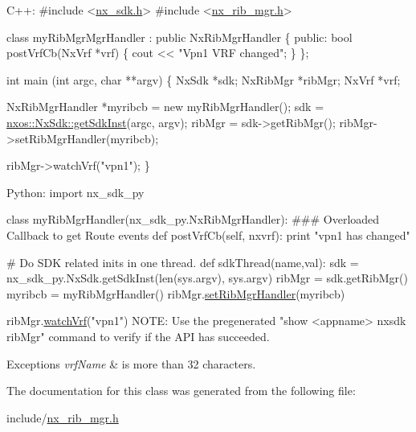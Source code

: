 \begin{DoxyCode}
 C++:
\textcolor{preprocessor}{      #include <\mbox{\hyperlink{nx__sdk_8h}{nx\_sdk.h}}>}
\textcolor{preprocessor}{      #include <\mbox{\hyperlink{nx__rib__mgr_8h}{nx\_rib\_mgr.h}}>}

      \textcolor{keyword}{class }myRibMgrMgrHandler : \textcolor{keyword}{public} NxRibMgrHandler \{
         \textcolor{keyword}{public}:
            \textcolor{keywordtype}{bool} postVrfCb(NxVrf *vrf) \{
                 cout << \textcolor{stringliteral}{"Vpn1 VRF changed"};
            \}
      \};

      \textcolor{keywordtype}{int}  main (\textcolor{keywordtype}{int} argc, \textcolor{keywordtype}{char} **argv)
      \{
           NxSdk    *sdk;
           NxRibMgr *ribMgr;
           NxVrf    *vrf;

           NxRibMgrHandler *myribcb = \textcolor{keyword}{new} myRibMgrHandler();
           sdk = \mbox{\hyperlink{classnxos_1_1_nx_sdk_a5050e2d26c40744b4fc7862068a83f39}{nxos::NxSdk::getSdkInst}}(argc, argv);
           ribMgr = sdk->getRibMgr();
           ribMgr->setRibMgrHandler(myribcb);

           ribMgr->watchVrf(\textcolor{stringliteral}{"vpn1"});
      \}

 Python:
    \textcolor{keyword}{import} nx\_sdk\_py

    \textcolor{keyword}{class }myRibMgrHandler(nx\_sdk\_py.NxRibMgrHandler):
\textcolor{preprocessor}{    ### Overloaded Callback to get Route events}
          def postVrfCb(self, nxvrf):
              print "vpn1 has changed"

\textcolor{preprocessor}{    # Do SDK related inits in one thread.}
    def sdkThread(name,val):
        sdk = nx\_sdk\_py.NxSdk.getSdkInst(len(sys.argv), sys.argv)
        ribMgr = sdk.getRibMgr()
        myribcb = myRibMgrHandler()
        ribMgr.\mbox{\hyperlink{classnxos_1_1_nx_rib_mgr_ac42dd29e34f9c508614733dbec518b99}{setRibMgrHandler}}(myribcb)

        ribMgr.\mbox{\hyperlink{classnxos_1_1_nx_rib_mgr_a35e2a52be337d47cd111803f64aca904}{watchVrf}}("vpn1")
NOTE: Use the pregenerated "show <appname> nxsdk ribMgr" command
      to verify if the API has succeeded.
\end{DoxyCode}



\begin{DoxyExceptions}{Exceptions}
{\em vrf\+Name} & is more than 32 characters. \\
\hline
\end{DoxyExceptions}


The documentation for this class was generated from the following file\+:\begin{DoxyCompactItemize}
\item 
include/\mbox{\hyperlink{nx__rib__mgr_8h}{nx\+\_\+rib\+\_\+mgr.\+h}}\end{DoxyCompactItemize}
